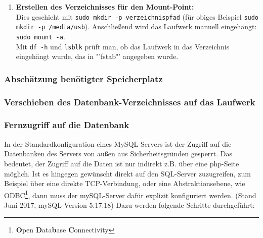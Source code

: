 \begin{enumerate}
	\item{\textbf{Erstellen des Verzeichnisses für den Mount-Point: }\\
		Dies geschieht mit \texttt{sudo mkdir -p verzeichnispfad} (für obiges Beispiel \texttt{sudo mkdir -p /media/usb}). Anschließend wird das Laufwerk manuell eingehängt:  \texttt{sudo mount -a}.\\
		Mit \texttt{df -h} und \texttt{lsblk} prüft man, ob das Laufwerk in das Verzeichnis eingehängt wurde, das in "'fstab"' angegeben wurde.
		
	} 
\end{enumerate}

\subsubsection{Abschätzung benötigter Speicherplatz}

\subsubsection{Verschieben des Datenbank-Verzeichnisses auf das Laufwerk}


\subsubsection{Fernzugriff auf die Datenbank}
In der Standardkonfiguration eines MySQL-Servers ist der Zugriff auf die Datenbanken des Servers von außen aus Sicherheitsgründen gesperrt. Das bedeutet, der Zugriff auf die Daten ist nur indirekt z.B. über eine php-Seite möglich. Ist es hingegen gewünscht direkt auf den SQL-Server zuzugreifen, zum Beispiel über eine direkte TCP-Verbindung, oder eine Abstraktionsebene, wie ODBC\footnote{\textbf{O}pen \textbf{D}ata\textbf{b}ase \textbf{C}onnectivity}, dann muss der mySQL-Server dafür explizit konfiguriert werden. (Stand Juni 2017, mySQL-Version 5.17.18)
Dazu werden folgende Schritte durchgeführt:

